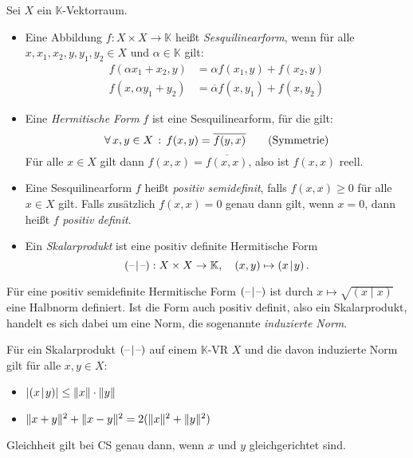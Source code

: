 \documentclass{cheat-sheet}
\newcommand{\K}{\mathbb{K}}
\newcommand{\scp}[2]{\left( #1 \!\mid\! #2 \right)} %
\begin{document}
\begin{definition}
  Sei $X$ ein $\K$-Vektorraum.
  \begin{itemize}
    \item Eine Abbildung $f : X \times X \to \K$ heißt \emph{Sesquilinearform}, wenn für alle $x, x_1, x_2, y, y_1, y_2 \in X$ und $\alpha \in \K$ gilt:
    \begin{align*}
      f(\alpha x_1 + x_2, y) &= \alpha f(x_1, y) + f(x_2, y) \tag*{(Linearität im 1. Arg)} \\
      f(x, \alpha y_1 + y_2) &= \overline{\alpha} f(x, y_1) + f(x, y_2) \tag*{(Antilinearität im 2. Arg)}
    \end{align*}
    \item Eine \emph{Hermitische Form} $f$ ist eine Sesquilinearform, für die gilt:
    \[ \forall \, {x, y \in X} \,:\, f(x, y) = \overline{f(y, x)} \tag*{(Symmetrie)} \]
    Für alle $x \in X$ gilt dann $f(x, x) = \overline{f(x, x)}$, also ist $f(x, x)$ reell.
    \item Eine Sesquilinearform $f$ heißt \emph{positiv semidefinit}, falls $f(x, x) \geq 0$ für alle $x \in X$ gilt. Falls zusätzlich $f(x, x) = 0$ genau dann gilt, wenn $x = 0$, dann heißt $f$ \emph{positiv definit}.
    \item Ein \emph{Skalarprodukt} ist eine positiv definite Hermitische Form
    \[ \scp{\blank}{\blank} : X \times X \to \K, \quad (x, y) \mapsto \scp{x}{y}. \]
  \end{itemize}
\end{definition}

\begin{satz}
  Für eine positiv semidefinite Hermitische Form $\scp{\blank}{\blank}$ ist durch $x \mapsto \sqrt{\scp{x}{x}}$ eine Halbnorm definiert. Ist die Form auch positiv definit, also ein Skalarprodukt, handelt es sich dabei um eine Norm, die sogenannte \emph{induzierte Norm}.
\end{satz}

\begin{satz}
  Für ein Skalarprodukt $\scp{\blank}{\blank}$ auf einem $\K$-VR $X$ und die davon induzierte Norm gilt für alle $x, y \in X$:
  \begin{itemize}
    \item $\abs{\scp{x}{y}} \leq \norm{x} \cdot \norm{y}$ 
    \item $\lVert x+y\rVert^2 + \lVert x-y\rVert^2 = 2 (\lVert x\rVert^2 + \lVert y\rVert^2)$ 
  \end{itemize}
  Gleichheit gilt bei CS genau dann, wenn $x$ und $y$ gleichgerichtet sind.
\end{satz}
\end{document}
